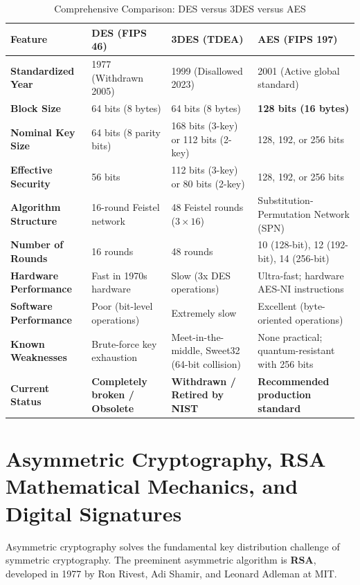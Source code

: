 \begin{table}[htbp]
\centering
\caption{Comprehensive Comparison: DES versus 3DES versus AES}
\label{tab:des_3des_aes}
\begin{tabularx}{\textwidth}{p{3.2cm} X X X}
\toprule
\textbf{Feature} & \textbf{DES (FIPS 46)} & \textbf{3DES (TDEA)} & \textbf{AES (FIPS 197)} \\
\midrule
\textbf{Standardized Year} & 1977 (Withdrawn 2005) & 1999 (Disallowed 2023) & 2001 (Active global standard) \\
\textbf{Block Size} & 64 bits (8 bytes) & 64 bits (8 bytes) & \textbf{128 bits (16 bytes)} \\
\textbf{Nominal Key Size} & 64 bits (8 parity bits) & 168 bits (3-key) or 112 bits (2-key) & 128, 192, or 256 bits \\
\textbf{Effective Security} & 56 bits & 112 bits (3-key) or 80 bits (2-key) & 128, 192, or 256 bits \\
\textbf{Algorithm Structure} & 16-round Feistel network & 48 Feistel rounds ($3 \times 16$) & Substitution-Permutation Network (SPN) \\
\textbf{Number of Rounds} & 16 rounds & 48 rounds & 10 (128-bit), 12 (192-bit), 14 (256-bit) \\
\textbf{Hardware Performance} & Fast in 1970s hardware & Slow (3x DES operations) & Ultra-fast; hardware AES-NI instructions \\
\textbf{Software Performance} & Poor (bit-level operations) & Extremely slow & Excellent (byte-oriented operations) \\
\textbf{Known Weaknesses} & Brute-force key exhaustion & Meet-in-the-middle, Sweet32 (64-bit collision) & None practical; quantum-resistant with 256 bits \\
\textbf{Current Status} & \textbf{Completely broken / Obsolete} & \textbf{Withdrawn / Retired by NIST} & \textbf{Recommended production standard} \\
\bottomrule
\end{tabularx}
\end{table}

\newpage
\section{Asymmetric Cryptography, RSA Mathematical Mechanics, and Digital Signatures}

Asymmetric cryptography solves the fundamental key distribution challenge of symmetric cryptography. The preeminent asymmetric algorithm is \textbf{RSA}, developed in 1977 by Ron Rivest, Adi Shamir, and Leonard Adleman at MIT.

